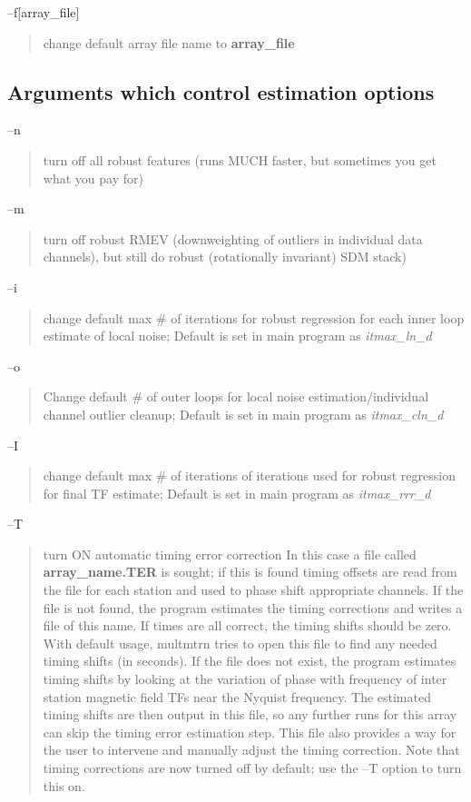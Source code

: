 --f[array\_file]  
\begin{quote}
change default array file name to {\bf array\_file}
\end{quote}

\subsection{Arguments which control estimation options}

--n   
\begin{quote}
turn off all robust features (runs MUCH faster, but sometimes you get what
you pay for)
\end{quote}

--m   
\begin{quote}
turn off robust RMEV (downweighting of outliers in individual data
channels), but still do robust (rotationally invariant) SDM stack)
\end{quote}

--i
\begin{quote}
change default max \# of iterations for robust
regression for each inner loop estimate of
local noise; Default is set in main program as {\it itmax\_ln\_d}
\end{quote}

--o
\begin{quote}
Change default \# of outer loops for local
noise estimation/individual channel outlier
cleanup; Default is set in main program as {\it itmax\_cln\_d}
\end{quote}

--I
\begin{quote}
change default max \# of iterations of iterations
used for robust regression for final TF
estimate;  Default is set in main program as {\it itmax\_rrr\_d}
\end{quote}

--T   
\begin{quote}
turn ON automatic timing error correction
In this case a file called {\bf array\_name.TER} is sought; if this is found
timing offsets are read from the file for each station and used to
phase shift appropriate channels.  If the file is not found, the program
estimates  the timing corrections and writes a file of this name.
If times are all correct, the timing shifts should be zero.   With 
default usage, multmtrn tries to open this file to find any 
needed timing shifts (in seconds).   If the file does not exist,
the program estimates timing shifts by looking at the variation of 
phase with frequency of inter station magnetic field TFs near the 
Nyquist frequency.  The estimated timing shifts are then output in this
file, so any further runs for this array can skip the timing error
estimation step.  This file also provides a way for the user to 
intervene and manually adjust the timing correction.  Note that
timing corrections are now turned off by default;  use the --T option 
to turn this on.
\end{quote}

